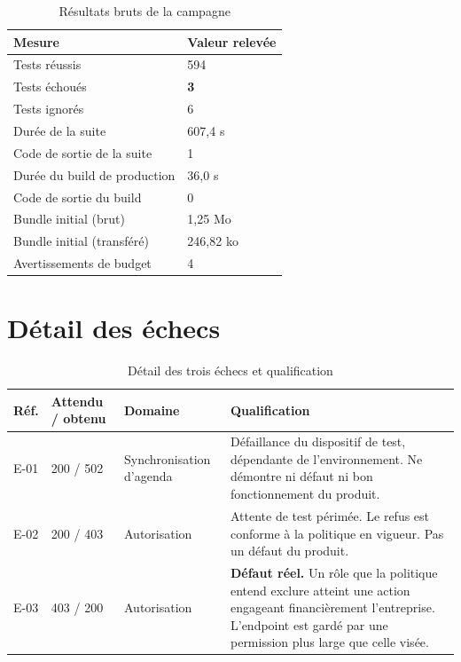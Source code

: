 \begin{table}[htbp]
  \centering
  \caption{Résultats bruts de la campagne}
  \label{tab:campaign_raw}
  \begin{tabularx}{\textwidth}{L{6.0cm} X}
    \toprule
    \textbf{Mesure} & \textbf{Valeur relevée} \\
    \midrule
    Tests réussis                 & 594 \\
    Tests échoués                 & \textbf{3} \\
    Tests ignorés                 & 6 \\
    Durée de la suite             & 607,4 s \\
    Code de sortie de la suite    & 1 \\
    Durée du build de production  & 36,0 s \\
    Code de sortie du build       & 0 \\
    Bundle initial (brut)         & 1,25 Mo \\
    Bundle initial (transféré)    & 246,82 ko \\
    Avertissements de budget      & 4 \\
    \bottomrule
  \end{tabularx}
\end{table}

\section{Détail des échecs}

\begin{table}[htbp]
  \centering
  \caption{Détail des trois échecs et qualification}
  \label{tab:campaign_failures}
  \begin{tabularx}{\textwidth}{L{1.2cm} L{2.2cm} L{2.6cm} X}
    \toprule
    \textbf{Réf.} & \textbf{Attendu / obtenu} & \textbf{Domaine} & \textbf{Qualification} \\
    \midrule
    E-01 & 200 / 502 & Synchronisation d'agenda
         & Défaillance du dispositif de test, dépendante de l'environnement. Ne démontre ni défaut ni bon fonctionnement du produit. \\
    E-02 & 200 / 403 & Autorisation
         & Attente de test périmée. Le refus est conforme à la politique en vigueur. Pas un défaut du produit. \\
    E-03 & 403 / 200 & Autorisation
         & \textbf{Défaut réel.} Un rôle que la politique entend exclure atteint une action engageant financièrement l'entreprise. L'endpoint est gardé par une permission plus large que celle visée. \\
    \bottomrule
  \end{tabularx}
\end{table}

